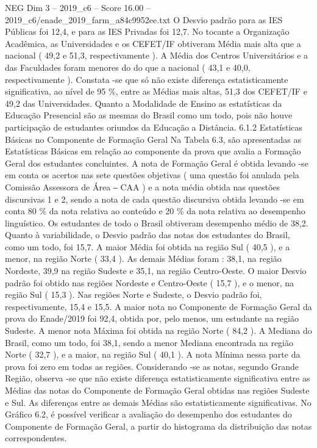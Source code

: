 \begin{textsample}{NEG Dim 3 – 2019\_c6 – Score 16.00 – 2019\_c6/enade\_2019\_farm\_a84c9952ee.txt}
O Desvio padrão para as IES Públicas foi 12,4, e para as IES Privadas foi 12,7.
No tocante a Organização Acadêmica, as Universidades e os CEFET/IF obtiveram Média mais alta que a nacional ( 49,2 e 51,3, respectivamente ).
A Média dos Centros Universitários e a das Faculdades foram menores do do que a nacional ( 43,1 e 40,0, respectivamente ).
Constata -se que só não existe diferença estatisticamente significativa, ao nível de 95 \%, entre as Médias mais altas, 51,3 dos CEFET/IF e 49,2 das Universidades.
Quanto a Modalidade de Ensino as estatísticas da Educação Presencial são as mesmas do Brasil como um todo, pois não houve participação de estudantes oriundos da Educação a Distância. 6.1.2 Estatísticas Básicas no Componente de Formação Geral Na Tabela 6.3, são apresentadas as Estatísticas Básicas em relação ao componente da prova que avalia a Formação Geral dos estudantes concluintes.
A nota de Formação Geral é obtida levando -se em conta os acertos nas sete questões objetivas ( uma questão foi anulada pela Comissão Assessora de Área ‒ CAA ) e a nota média obtida nas questões discursivas 1 e 2, sendo a nota de cada questão discursiva obtida levando -se em conta 80 \% da nota relativa ao conteúdo e 20 \% da nota relativa ao desempenho linguístico.
Os estudantes de todo o Brasil obtiveram desempenho médio de 38,2.
Quanto à variabilidade, o Desvio padrão das notas dos estudantes do Brasil, como um todo, foi 15,7.
A maior Média foi obtida na região Sul ( 40,5 ), e a menor, na região Norte ( 33,4 ).
As demais Médias foram : 38,1, na região Nordeste, 39,9 na região Sudeste e 35,1, na região Centro-Oeste.
O maior Desvio padrão foi obtido nas regiões Nordeste e Centro-Oeste ( 15,7 ), e o menor, na região Sul ( 15,3 ).
Nas regiões Norte e Sudeste, o Desvio padrão foi, respectivamente, 15,4 e 15,5.
A maior nota no Componente de Formação Geral da prova do Enade/2019 foi 92,4, obtida por, pelo menos, um estudante na região Sudeste.
A menor nota Máxima foi obtida na região Norte ( 84,2 ).
A Mediana do Brasil, como um todo, foi 38,1, sendo a menor Mediana encontrada na região Norte ( 32,7 ), e a maior, na região Sul ( 40,1 ).
A nota Mínima nessa parte da prova foi zero em todas as regiões.
Considerando -se as notas, segundo Grande Região, observa -se que não existe diferença estatisticamente significativa entre as Médias das notas do Componente de Formação Geral obtidas nas regiões Sudeste e Sul.
As diferenças entre as demais Médias são estatisticamente significativas.
No Gráfico 6.2, é possível verificar a avaliação do desempenho dos estudantes do Componente de Formação Geral, a partir do histograma da distribuição das notas correspondentes.

\end{textsample}
